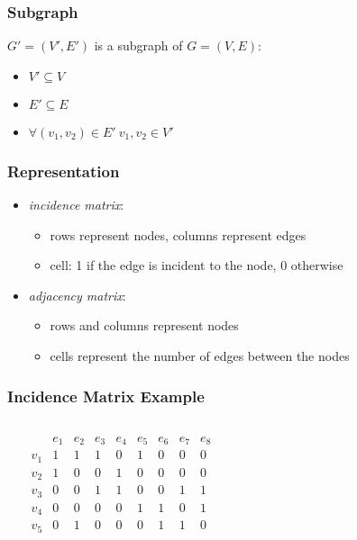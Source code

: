 \documentclass[dvipsnames]{beamer}
\begin{document}
\begin{frame}
  \frametitle{Subgraph}

  \begin{definition}
    $G'=(V',E')$ is a \alert{subgraph} of $G=(V,E)$:

    \begin{itemize}
      \item $V' \subseteq V$
      \item $E' \subseteq E$
      \item $\forall (v_1,v_2) \in E'~v_1,v_2 \in V'$
    \end{itemize}
  \end{definition}
\end{frame}

\begin{frame}
  \frametitle{Representation}

  \begin{itemize}
    \item \emph{incidence matrix}:
    \begin{itemize}
      \item rows represent nodes, columns represent edges
      \item cell: 1 if the edge is incident to the node, 0 otherwise
    \end{itemize}

    \pause
    \medskip
    \item \emph{adjacency matrix}:
    \begin{itemize}
      \item rows and columns represent nodes
      \item cells represent the number of edges between the nodes
    \end{itemize}
  \end{itemize}
\end{frame}

\begin{frame}
  \frametitle{Incidence Matrix Example}

  \begin{example}
    \begin{columns}
      \begin{center}
      \end{center}

      \[
        \begin{array}{c|cccccccc}
              & e_1 & e_2 & e_3 & e_4 & e_5 & e_6 & e_7 & e_8\\\hline
          v_1 & 1 & 1 & 1 & 0 & 1 & 0 & 0 & 0\\
          v_2 & 1 & 0 & 0 & 1 & 0 & 0 & 0 & 0\\
          v_3 & 0 & 0 & 1 & 1 & 0 & 0 & 1 & 1\\
          v_4 & 0 & 0 & 0 & 0 & 1 & 1 & 0 & 1\\
          v_5 & 0 & 1 & 0 & 0 & 0 & 1 & 1 & 0
        \end{array}
      \]
    \end{columns}
  \end{example}
\end{frame}
\end{document}
